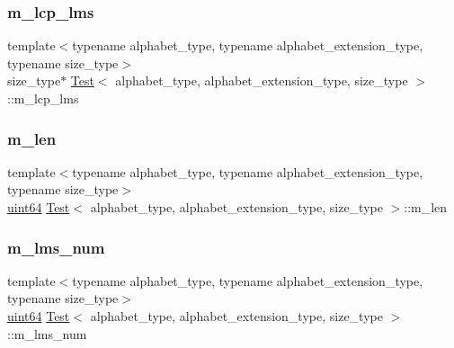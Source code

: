 \mbox{\label{class_test_a94d43daa04ae5011cc46d8fd3dc8c83b}} 
\subsubsection{\texorpdfstring{m\+\_\+lcp\+\_\+lms}{m\_lcp\_lms}}
{\footnotesize\ttfamily template$<$typename alphabet\+\_\+type, typename alphabet\+\_\+extension\+\_\+type, typename size\+\_\+type$>$ \\
size\+\_\+type$\ast$ \hyperlink{class_test}{Test}$<$ alphabet\+\_\+type, alphabet\+\_\+extension\+\_\+type, size\+\_\+type $>$\+::m\+\_\+lcp\+\_\+lms\hspace{0.3cm}{\ttfamily [private]}}

\mbox{\label{class_test_ac0031d768664e62b04aa14acaecdb354}} 
\subsubsection{\texorpdfstring{m\+\_\+len}{m\_len}}
{\footnotesize\ttfamily template$<$typename alphabet\+\_\+type, typename alphabet\+\_\+extension\+\_\+type, typename size\+\_\+type$>$ \\
\hyperlink{types_8h_a60e8696a4678cd348e991a1f172e53f7}{uint64} \hyperlink{class_test}{Test}$<$ alphabet\+\_\+type, alphabet\+\_\+extension\+\_\+type, size\+\_\+type $>$\+::m\+\_\+len\hspace{0.3cm}{\ttfamily [private]}}

\mbox{\label{class_test_a3a2c92b2ace889d7c98d1188ee2542c5}} 
\subsubsection{\texorpdfstring{m\+\_\+lms\+\_\+num}{m\_lms\_num}}
{\footnotesize\ttfamily template$<$typename alphabet\+\_\+type, typename alphabet\+\_\+extension\+\_\+type, typename size\+\_\+type$>$ \\
\hyperlink{types_8h_a60e8696a4678cd348e991a1f172e53f7}{uint64} \hyperlink{class_test}{Test}$<$ alphabet\+\_\+type, alphabet\+\_\+extension\+\_\+type, size\+\_\+type $>$\+::m\+\_\+lms\+\_\+num\hspace{0.3cm}{\ttfamily [private]}}

